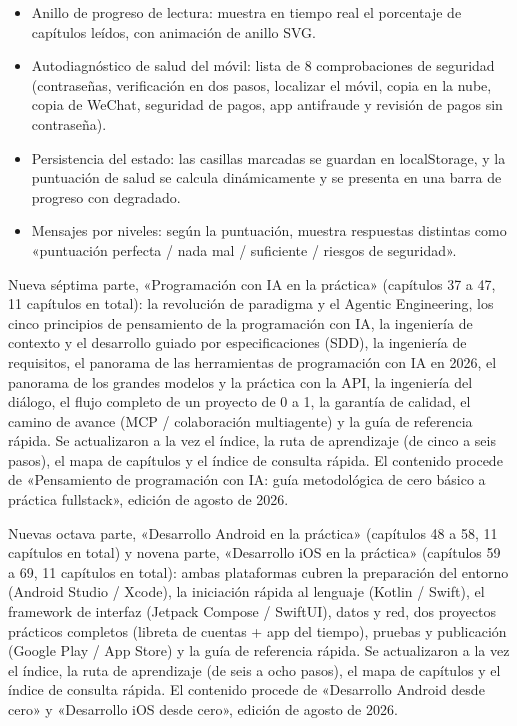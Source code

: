 \begin{itemize}
  \item Anillo de progreso de lectura: muestra en tiempo real el porcentaje de capítulos leídos, con animación de anillo SVG.
  \item Autodiagnóstico de salud del móvil: lista de 8 comprobaciones de seguridad (contraseñas, verificación en dos pasos, localizar el móvil, copia en la nube, copia de WeChat, seguridad de pagos, app antifraude y revisión de pagos sin contraseña).
  \item Persistencia del estado: las casillas marcadas se guardan en localStorage, y la puntuación de salud se calcula dinámicamente y se presenta en una barra de progreso con degradado.
  \item Mensajes por niveles: según la puntuación, muestra respuestas distintas como «puntuación perfecta / nada mal / suficiente / riesgos de seguridad».
\end{itemize}


Nueva séptima parte, «Programación con IA en la práctica» (capítulos 37 a 47, 11 capítulos en total): la revolución de paradigma y el Agentic Engineering, los cinco principios de pensamiento de la programación con IA, la ingeniería de contexto y el desarrollo guiado por especificaciones (SDD), la ingeniería de requisitos, el panorama de las herramientas de programación con IA en 2026, el panorama de los grandes modelos y la práctica con la API, la ingeniería del diálogo, el flujo completo de un proyecto de 0 a 1, la garantía de calidad, el camino de avance (MCP / colaboración multiagente) y la guía de referencia rápida. Se actualizaron a la vez el índice, la ruta de aprendizaje (de cinco a seis pasos), el mapa de capítulos y el índice de consulta rápida. El contenido procede de «Pensamiento de programación con IA: guía metodológica de cero básico a práctica fullstack», edición de agosto de 2026.

Nuevas octava parte, «Desarrollo Android en la práctica» (capítulos 48 a 58, 11 capítulos en total) y novena parte, «Desarrollo iOS en la práctica» (capítulos 59 a 69, 11 capítulos en total): ambas plataformas cubren la preparación del entorno (Android Studio / Xcode), la iniciación rápida al lenguaje (Kotlin / Swift), el framework de interfaz (Jetpack Compose / SwiftUI), datos y red, dos proyectos prácticos completos (libreta de cuentas + app del tiempo), pruebas y publicación (Google Play / App Store) y la guía de referencia rápida. Se actualizaron a la vez el índice, la ruta de aprendizaje (de seis a ocho pasos), el mapa de capítulos y el índice de consulta rápida. El contenido procede de «Desarrollo Android desde cero» y «Desarrollo iOS desde cero», edición de agosto de 2026.

